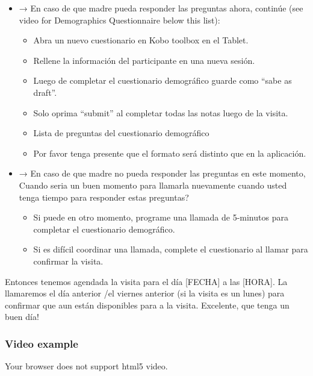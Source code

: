 \documentclass[
  12pt,
]{book}
\providecommand{\tightlist}{%
  \setlength{\itemsep}{0pt}\setlength{\parskip}{0pt}}
\begin{document}
\begin{itemize}
\tightlist
\item
  → En caso de que madre pueda responder las preguntas ahora, continúe (see video for Demographics Questionnaire below this list):

  \begin{itemize}
  \tightlist
  \item
    Abra un nuevo cuestionario en Kobo toolbox en el Tablet.
  \item
    Rellene la información del participante en una nueva sesión.
  \item
    Luego de completar el cuestionario demográfico guarde como ``sabe as draft''.
  \item
    Solo oprima ``submit'' al completar todas las notas luego de la visita.
  \item
    Lista de preguntas del cuestionario demográfico  
  \item
    Por favor tenga presente que el formato será distinto que en la aplicación.
  \end{itemize}
\item
  → En caso de que madre no pueda responder las preguntas en este momento, Cuando seria un buen momento para llamarla nuevamente cuando usted tenga tiempo para responder estas preguntas?

  \begin{itemize}
  \tightlist
  \item
    Si puede en otro momento, programe una llamada de 5-minutos para completar el cuestionario demográfico.
  \item
    Si es difícil coordinar una llamada, complete el cuestionario al llamar para confirmar la visita.
  \end{itemize}
\end{itemize}

Entonces tenemos agendada la visita para el día {[}FECHA{]} a las {[}HORA{]}. La llamaremos el día anterior /el viernes anterior (si la visita es un lunes) para confirmar que aun están disponibles para a la visita. Excelente, que tenga un buen día!

\hypertarget{recruiting_call_video_spanish}{%
\subsubsection*{Video example}\label{recruiting_call_video_spanish}}

Your browser does not support html5 video.
\end{document}
